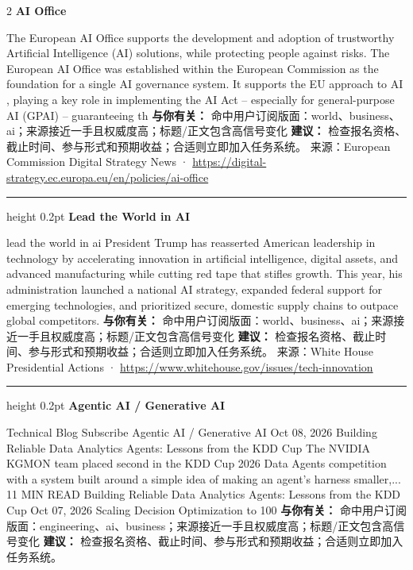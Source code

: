 \documentclass[10.5pt]{ctexart}
\begin{document}
\begin{multicols}{2}
{\large\bfseries AI Office}\par
The European AI Office supports the development and adoption of trustworthy Artificial Intelligence (AI) solutions, while protecting people against risks. The European AI Office was established within the European Commission as the foundation for a single AI governance system. It supports the EU approach to AI , playing a key role in implementing the AI Act – especially for general-purpose AI (GPAI) – guaranteeing th
\textbf{与你有关：} 命中用户订阅版面：world、business、ai；来源接近一手且权威度高；标题/正文包含高信号变化
\textbf{建议：} 检查报名资格、截止时间、参与形式和预期收益；合适则立即加入任务系统。
{\footnotesize\color{ormuted} 来源：European Commission Digital Strategy News · \url{https://digital-strategy.ec.europa.eu/en/policies/ai-office}}
\vspace{2mm}
\hrule height 0.2pt
\vspace{2mm}
{\large\bfseries Lead the World in AI}\par
lead the world in ai President Trump has reasserted American leadership in technology by accelerating innovation in artificial intelligence, digital assets, and advanced manufacturing while cutting red tape that stifles growth. This year, his administration launched a national AI strategy, expanded federal support for emerging technologies, and prioritized secure, domestic supply chains to outpace global competitors.
\textbf{与你有关：} 命中用户订阅版面：world、business、ai；来源接近一手且权威度高；标题/正文包含高信号变化
\textbf{建议：} 检查报名资格、截止时间、参与形式和预期收益；合适则立即加入任务系统。
{\footnotesize\color{ormuted} 来源：White House Presidential Actions · \url{https://www.whitehouse.gov/issues/tech-innovation}}
\vspace{2mm}
\hrule height 0.2pt
\vspace{2mm}
{\large\bfseries Agentic AI / Generative AI}\par
Technical Blog Subscribe Agentic AI / Generative AI Oct 08, 2026 Building Reliable Data Analytics Agents: Lessons from the KDD Cup The NVIDIA KGMON team placed second in the KDD Cup 2026 Data Agents competition with a system built around a simple idea of making an agent's harness smaller,... 11 MIN READ Building Reliable Data Analytics Agents: Lessons from the KDD Cup Oct 07, 2026 Scaling Decision Optimization to 100
\textbf{与你有关：} 命中用户订阅版面：engineering、ai、business；来源接近一手且权威度高；标题/正文包含高信号变化
\textbf{建议：} 检查报名资格、截止时间、参与形式和预期收益；合适则立即加入任务系统。

\end{multicols}
\end{document}

